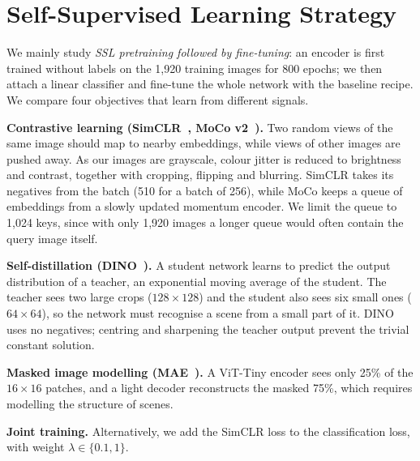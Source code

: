 \documentclass{article}
\begin{document}
\section{Self-Supervised Learning Strategy}
\label{sec:ssl}

We mainly study \emph{SSL pretraining followed by fine-tuning}: an encoder is first trained without labels on the 1,920 training images for 800 epochs; we then attach a linear classifier and fine-tune the whole network with the baseline recipe. We compare four objectives that learn from different signals.

\textbf{Contrastive learning (SimCLR~\cite{simclr}, MoCo v2~\cite{mocov2}).} Two random views of the same image should map to nearby embeddings, while views of other images are pushed away. As our images are grayscale, colour jitter is reduced to brightness and contrast, together with cropping, flipping and blurring. SimCLR takes its negatives from the batch (510 for a batch of 256), while MoCo keeps a queue of embeddings from a slowly updated momentum encoder. We limit the queue to 1,024 keys, since with only 1,920 images a longer queue would often contain the query image itself.

\textbf{Self-distillation (DINO~\cite{dino}).} A student network learns to predict the output distribution of a teacher, an exponential moving average of the student. The teacher sees two large crops ($128\times128$) and the student also sees six small ones ($64\times64$), so the network must recognise a scene from a small part of it. DINO uses no negatives; centring and sharpening the teacher output prevent the trivial constant solution.

\textbf{Masked image modelling (MAE~\cite{mae}).} A ViT-Tiny encoder sees only 25\% of the $16\times16$ patches, and a light decoder reconstructs the masked 75\%, which requires modelling the structure of scenes.

\textbf{Joint training.} Alternatively, we add the SimCLR loss to the classification loss, with weight $\lambda\in\{0.1,1\}$.
\end{document}
